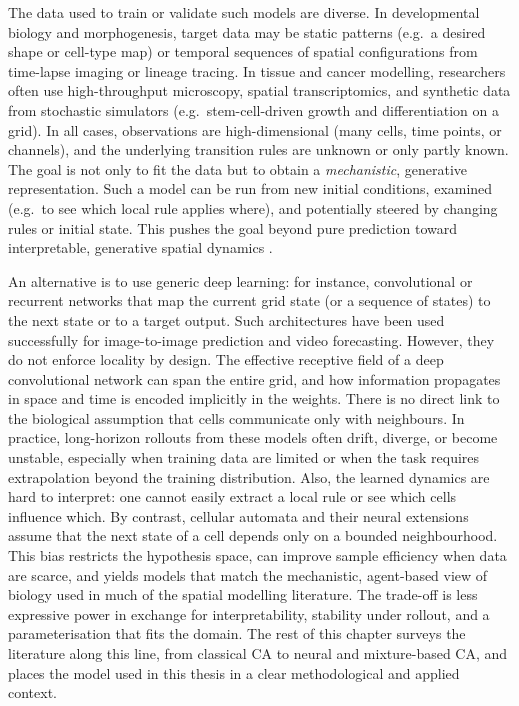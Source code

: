 The data used to train or validate such models are diverse. In developmental biology and morphogenesis, target data may be static patterns (e.g.\ a desired shape or cell-type map) or temporal sequences of spatial configurations from time-lapse imaging or lineage tracing. In tissue and cancer modelling, researchers often use high-throughput microscopy, spatial transcriptomics, and synthetic data from stochastic simulators (e.g.\ stem-cell-driven growth and differentiation on a grid). In all cases, observations are high-dimensional (many cells, time points, or channels), and the underlying transition rules are unknown or only partly known. The goal is not only to fit the data but to obtain a \emph{mechanistic}, generative representation. Such a model can be run from new initial conditions, examined (e.g.\ to see which local rule applies where), and potentially steered by changing rules or initial state. This pushes the goal beyond pure prediction toward interpretable, generative spatial dynamics \cite{mnca_milite2025,nca_mordvintsev2020}.

An alternative is to use generic deep learning: for instance, convolutional or recurrent networks that map the current grid state (or a sequence of states) to the next state or to a target output. Such architectures have been used successfully for image-to-image prediction and video forecasting. However, they do not enforce locality by design. The effective receptive field of a deep convolutional network can span the entire grid, and how information propagates in space and time is encoded implicitly in the weights. There is no direct link to the biological assumption that cells communicate only with neighbours. In practice, long-horizon rollouts from these models often drift, diverge, or become unstable, especially when training data are limited or when the task requires extrapolation beyond the training distribution. Also, the learned dynamics are hard to interpret: one cannot easily extract a local rule or see which cells influence which. By contrast, cellular automata and their neural extensions assume that the next state of a cell depends only on a bounded neighbourhood. This bias restricts the hypothesis space, can improve sample efficiency when data are scarce, and yields models that match the mechanistic, agent-based view of biology used in much of the spatial modelling literature. The trade-off is less expressive power in exchange for interpretability, stability under rollout, and a parameterisation that fits the domain. The rest of this chapter surveys the literature along this line, from classical CA to neural and mixture-based CA, and places the model used in this thesis in a clear methodological and applied context.

